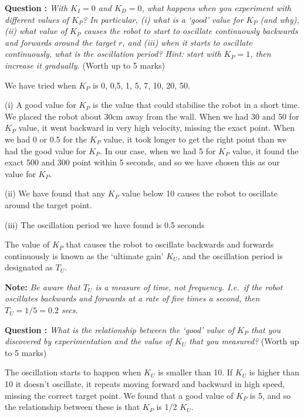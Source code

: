 \documentclass[hidelinks,a4paper,11pt]{article}
\newcounter{question}
\newcommand\myq{\refstepcounter{question}\thequestion}
\begin{document}
	{\bfseries Question \myq:}  \emph{With $K_I=0$ and $K_D=0$, what happens when you experiment with different values of $K_P$?  In particular, (i) what is a `good' value for $K_P$ (and why), (ii) what value of $K_P$ causes the robot to start to oscillate continuously backwards and forwards around the target $r$, and (iii) when it starts to oscillate continuously, what is the oscillation period?  Hint: start with $K_P =1$, then increase it gradually.} (Worth up to 5 marks)\\
	\begin{mdframed}
		We have tried when $K_P$ is 0, 0,5, 1, 5, 7, 10, 20, 50.
		
		(i) A good value for $K_P$ is the value that could stabilise the robot in a short time. We placed the robot about 30cm away from the wall. When we had 30 and 50 for $K_P$ value, it went backward in very high velocity, missing the exact point. When we had 0 or 0.5 for the $K_P$ value, it took longer to get the right point than we had the good value for $K_P$. In our case, when we had 5 for $K_P$ value, it found the exact 500 and 300 point within 5 seconds, and so we have chosen this as our value for $K_P$.
		
		(ii) We have found that any  $K_P$ value below 10 causes the robot to oscillate around the target point.
		
		(iii) The oscillation period we have found is 0.5 seconds
	\end{mdframed}
	\vspace*{\baselineskip}
	
	The value of $K_P$ that causes the robot to oscillate backwards and forwards continuously is known as the `ultimate gain' $K_U$, and the oscillation period is designated as $T_U$.
	
	{\bfseries Note:}  \emph{Be aware that $T_U$ is a measure of time, not frequency.  I.e.\ if the robot oscillates backwards and forwards at a rate of five times a second, then $T_U=1/5=0.2$ secs.}
	
	{\bfseries Question \myq:}  \emph{What is the relationship between the `good' value of $K_P$ that you discovered by experimentation and the value of $K_U$ that you measured?} (Worth up to 5 marks)\\
	\begin{mdframed}
		
		The oscillation starts to happen when $K_U$ is smaller than 10. If $K_U$ is higher than 10 it doesn't oscillate, it repeats moving forward and backward in high speed, missing the correct target point.
		We found that a good value of $K_P$ is 5, and so the relationship between these is that $K_P$ is 1/2 $K_U$.
	\end{mdframed}
	\vspace*{\baselineskip}
	
\end{document}
